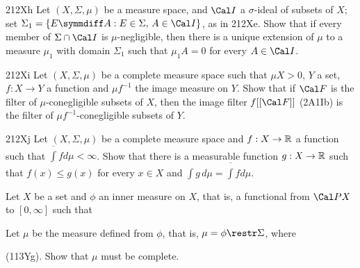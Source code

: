 {\spheader 212Xh Let $(X,\Sigma,\mu)$ be a measure 
space, and $\Cal I$ a
$\sigma$-ideal of subsets of $X$;  set
$\Sigma_1=\{E\symmdiff A:E\in\Sigma,\,A\in\Cal I\}$, as in 212Xe.
Show that if every member of $\Sigma\cap\Cal I$
is $\mu$-negligible, then there is a unique extension of $\mu$ to a
measure $\mu_1$ with domain $\Sigma_1$ such that $\mu_1A=0$ for every
$A\in\Cal I$.

\spheader 212Xi
Let $(X,\Sigma,\mu)$ be a complete measure space such that
$\mu X>0$, $Y$ a set, $f:X\to Y$ a function and $\mu f^{-1}$ the image
measure on $Y$.   Show that if $\Cal F$ is the filter of
$\mu$-conegligible subsets of $X$, then the image filter $f[[\Cal F]]$
(2A1Ib) is the filter of $\mu f^{-1}$-conegligible subsets of $Y$.

\spheader 212Xj
Let $(X,\Sigma,\mu)$ be a complete measure space and $f:X\to\Bbb R$ a
function such that $\overline{\int}fd\mu<\infty$.   Show that there is a
measurable function $g:X\to\Bbb R$ such that $f(x)\le g(x)$ for every 
$x\in X$ and $\int g\,d\mu=\overline{\int}fd\mu$.

Let $X$ be a set and $\phi$ an inner measure on $X$,
that is, a functional from $\Cal PX$ to $[0,\infty]$ such that




\noindent Let $\mu$ be the measure defined from $\phi$, that is,
$\mu=\phi\restr\Sigma$, where


\noindent (113Yg).   Show that $\mu$ must be complete.
}%

